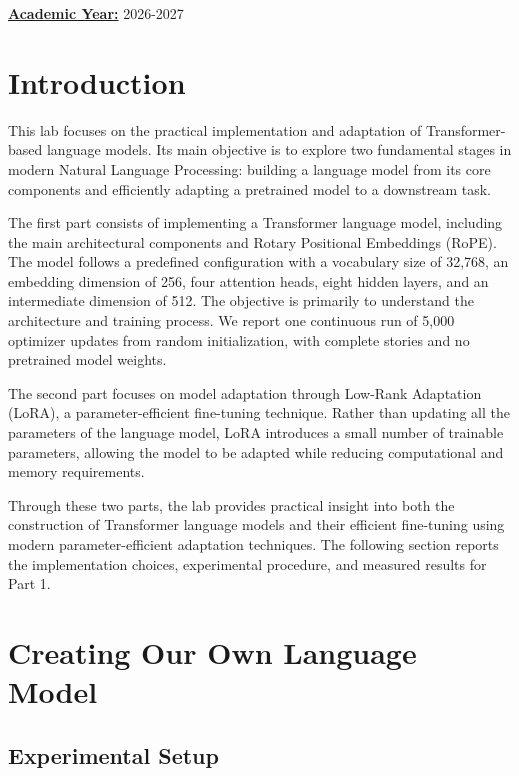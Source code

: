 \documentclass[a4paper, 12pt]{article}
\begin{document}
\begin{center}
    \underline{\textbf{Academic Year:}} 2026-2027
\end{center}

\newpage
\tableofcontents
\newpage
\section{Introduction}

This lab focuses on the practical implementation and adaptation of Transformer-based language models. Its main objective is to explore two fundamental stages in modern Natural Language Processing: building a language model from its core components and efficiently adapting a pretrained model to a downstream task.

The first part consists of implementing a Transformer language model, including the main architectural components and Rotary Positional Embeddings (RoPE). The model follows a predefined configuration with a vocabulary size of 32,768, an embedding dimension of 256, four attention heads, eight hidden layers, and an intermediate dimension of 512. The objective is primarily to understand the architecture and training process. We report one continuous run of 5,000 optimizer updates from random initialization, with complete stories and no pretrained model weights.

The second part focuses on model adaptation through Low-Rank Adaptation (LoRA), a parameter-efficient fine-tuning technique. Rather than updating all the parameters of the language model, LoRA introduces a small number of trainable parameters, allowing the model to be adapted while reducing computational and memory requirements.

Through these two parts, the lab provides practical insight into both the construction of Transformer language models and their efficient fine-tuning using modern parameter-efficient adaptation techniques. The following section reports the implementation choices, experimental procedure, and measured results for Part 1.

\section{Creating Our Own Language Model}

\subsection{Experimental Setup}
\end{document}
